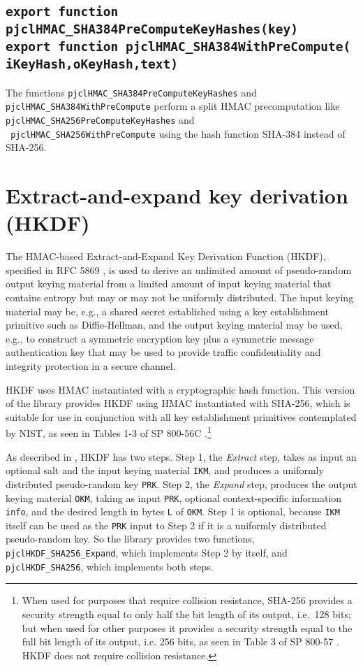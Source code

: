 \documentclass[12pt]{article}
\begin{document}
\subsection{\tt export function pjclHMAC\_SHA384PreComputeKeyHashes(key)\\export function pjclHMAC\_SHA384WithPreCompute(\\\mbox{}\hspace{.2in}iKeyHash,oKeyHash,text)}

The functions {\tt pjclHMAC\_SHA384PreComputeKeyHashes} and {\tt
  pjclHMAC\_SHA384WithPreCompute} perform a split HMAC precomputation
like {\tt pjclHMAC\_SHA256PreComputeKeyHashes} and\\{\tt
  pjclHMAC\_SHA256WithPreCompute} using the hash function SHA-384
instead of SHA-256.

\section{Extract-and-expand key derivation (HKDF)} 

The HMAC-based Extract-and-Expand Key Derivation Function (HKDF),
specified in RFC 5869 \cite{RFC5869}, is used to derive an unlimited amount
of pseudo-random output keying material from a limited amount of input keying material 
that contains entropy but may or may not be uniformly distributed.  
The input keying material may be, e.g., a shared secret established using a key establishment
primitive such as Diffie-Hellman, and the output keying material may be used, e.g., 
to construct a symmetric encryption key plus a symmetric message authentication key
that may be used to provide traffic confidentiality and integrity protection in a secure channel.

HKDF uses HMAC instantiated with a cryptographic hash function.  This version of the library provides
HKDF using HMAC instantiated with SHA-256, which is suitable for use in conjunction with all key establishment primitives
contemplated by NIST, as seen in Tables 1-3 of SP 800-56C \cite{sp800-56C}.\footnote{When
used for purposes that require collision resistance, SHA-256 provides a security strength 
equal to only half the bit length of its output, i.e.\ 128 bits; but when used for other purposes it
provides a security strength equal to the full bit length of its output, i.e. 256 bits, as seen in 
Table 3 of SP 800-57 \cite{sp800-57part1rev4}.  HKDF 
does not require collision resistance.}

As described in \cite{RFC5869}, HKDF has two steps.  Step 1, the {\em Extract\/} step, takes
as input an optional salt and the input keying material {\tt IKM}, and produces a 
uniformly distributed pseudo-random key {\tt PRK}.  Step 2, the {\em Expand\/} step, 
produces the output keying material {\tt OKM}, taking
as input {\tt PRK}, optional context-specific information {\tt info}, and the desired 
length in bytes {\tt L} of {\tt OKM}.  
Step 1 is optional, because {\tt IKM} itself can be used as the {\tt PRK} input to Step 2
if it is a uniformly distributed pseudo-random key.  So the library provides two functions,
{\tt pjclHKDF\_SHA256\_Expand}, which implements Step 2 by itself, and {\tt pjclHKDF\_SHA256}, which
implements both steps.
\end{document}
